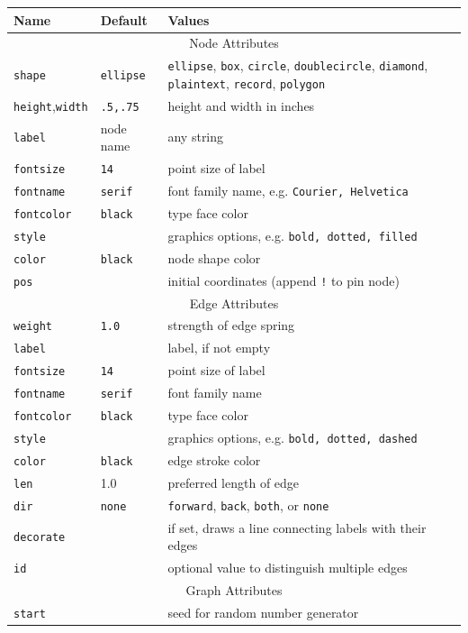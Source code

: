 \documentclass[11pt]{article}
\begin{document}
\begin{table}
\begin{tabular}[t]{|l|l|p{3.5in}|} \hline
Name & Default & \hfil Values \hfil \\ \hline
\multicolumn{3}{|c|}{Node Attributes} \\ \hline
{\tt shape} & {\tt ellipse} & {\tt ellipse}, {\tt box}, {\tt circle}, {\tt doublecircle}, {\tt diamond}, {\tt plaintext}, {\tt record}, {\tt polygon} \\
{\tt height},{\tt width} & {\tt .5,.75} & height and width in inches \\
{\tt label} & node name & any string \\
{\tt fontsize} & {\tt 14} & point size of label \\
{\tt fontname} & {\tt serif} & font family name, e.g. {\tt Courier, Helvetica} \\
{\tt fontcolor} & {\tt black} & type face color \\
{\tt style} & & graphics options, e.g. {\tt bold, dotted, filled} \\ 
{\tt color} & {\tt black} & node shape color \\ 
{\tt pos} & & initial coordinates (append {\tt !} to pin node) \\ \hline
\multicolumn{3}{|c|}{Edge Attributes}   \\ \hline
{\tt weight} & {\tt 1.0} & strength of edge spring \\
{\tt label} & & label, if not empty \\
{\tt fontsize} & {\tt 14} & point size of label \\
{\tt fontname} & {\tt serif} & font family name \\
{\tt fontcolor} & {\tt black} & type face color \\
{\tt style} & & graphics options, e.g. {\tt bold, dotted, dashed} \\ 
{\tt color} & {\tt black} & edge stroke color \\
{\tt len} & 1.0 & preferred length of edge \\
{\tt dir} & {\tt none} & {\tt forward}, {\tt back}, {\tt both}, or {\tt none} \\ 
{\tt decorate} & & if set, draws a line connecting labels with their edges \\
{\tt id} & & optional value to distinguish multiple edges \\ \hline
\multicolumn{3}{|c|}{Graph Attributes}  \\ \hline
{\tt start} & & seed for random number generator \\

\end{tabular}
\end{table}
\end{document}
